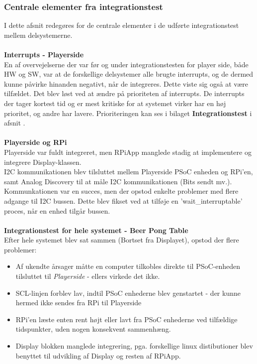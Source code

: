 \documentclass[Rapport/Rapport_main.tex]{subfiles}
\begin{document}
\subsubsection{Centrale elementer fra integrationstest}
I dette afsnit redegøres for de centrale elementer i de udførte integrationstest mellem delsystemerne. \\\\
\textbf{Interrupts - Playerside}\\
En af overvejelserne der var før og under integrationstesten for player side, både HW og SW, var at de forskellige delsystemer alle brugte interrupts, og de dermed kunne påvirke hinanden negativt, når de integreres. Dette viste sig også at være tilfældet. Det blev løst ved at ændre på prioriteten af interrupts. De interrupts der tager kortest tid og er mest kritiske for at systemet virker har en høj prioritet, og andre har lavere. Prioriteringen kan ses i bilaget \textbf{Integrationstest} i afsnit .\\\\
\textbf{Playerside og RPi} \\
Playerside var fuldt integreret, men RPiApp manglede stadig at implementere og integrere Display-klassen. \\
I2C kommunikationen blev tilsluttet mellem Playerside PSoC enheden og RPi'en, samt Analog Discovery til at måle I2C kommunikationen (Bits sendt mv.). \\
Kommunkationen var en succes, men der opstod enkelte problemer med flere adgange til I2C bussen. Dette blev fikset ved at tilføje en 'wait\_interruptable' proces, når en enhed tilgår bussen. \\\\
\textbf{Integrationstest for hele systemet - Beer Pong Table}\\
Efter hele systemet blev sat sammen (Bortset fra Displayet), opstod der flere problemer:
\begin{itemize}
    \item Af ukendte årsager måtte en computer tilkobles direkte til PSoC-enheden tilsluttet til \textit{Playerside} - ellers virkede det ikke. 
    \item SCL-linjen forblev lav, indtil PSoC enhederne blev genstartet - der kunne hermed ikke sendes fra RPi til Playerside
    \item RPi'en læste enten rent højt eller lavt fra PSoC enhederne ved tilfældige tidspunkter, uden nogen konsekvent sammenhæng. 
    \item Display blokken manglede integrering, pga. forskellige linux distibutioner blev benyttet til udvikling af Display og resten af RPiApp.
\end{itemize}
\end{document}
